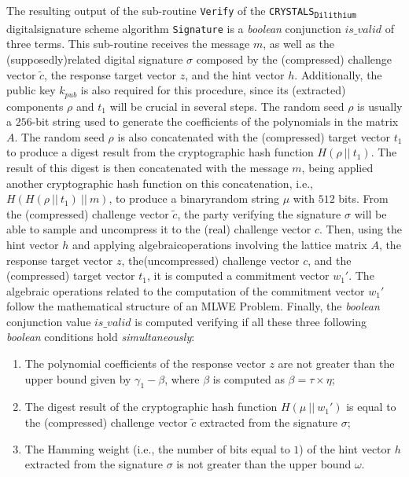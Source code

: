 \documentclass[runningheads]{llncs}
\numberwithin{equation}{section}
\begin{document}
    \noindent The resulting output of the sub-routine \texttt{Verify} of the \texorpdfstring{\texttt{CRYSTALS}\textsubscript{\texttt{Dilithium}}}\/ digital\break signature scheme algorithm \texttt{Signature} is a \textit{boolean} conjunction $is\_valid$ of three terms. This sub-routine receives the message $m$, as well as the (supposedly)\break related digital signature $\sigma$ composed by the (compressed) challenge vector $\tilde{c}$, the response target vector $z$, and the hint vector $h$. Additionally, the public key ${k}_{pub}$ is also required for this procedure, since its (extracted) components $\rho$ and ${t}_{1}$ will be crucial in several steps. The random seed $\rho$ is usually a $256$-bit string used to generate the coefficients of the polynomials in the matrix $A$. The random seed $\rho$ is also concatenated with the (compressed) target vector ${t}_{1}$ to produce a digest result from the cryptographic hash function $H(\rho\ ||\ {t}_{1})$. The result of this digest is then concatenated with the message $m$, being applied another cryptographic hash function on this concatenation, i.e., $H\left(H( \rho\ ||\ {t}_{1} )\ ||\ m \right)$, to produce a binary\break random string $\mu$ with $512$ bits. From the (compressed) challenge vector $\tilde{c}$, the party verifying the signature $\sigma$ will be able to sample and uncompress it to the (real) challenge vector $c$. Then, using the hint vector $h$ and applying algebraic\break operations involving the lattice matrix $A$, the response target vector $z$, the\break (uncompressed) challenge vector $c$, and the (compressed) target vector ${t}_{1}$, it is computed a commitment vector ${w}_{1}'$. The algebraic operations related to the computation of the commitment vector ${w}_{1}'$ follow the mathematical structure of an MLWE Problem. Finally, the \textit{boolean} conjunction value $is\_valid$ is computed verifying if all these three following \textit{boolean} conditions hold \textit{simultaneously}:
    \begin{enumerate}
        \item The polynomial coefficients of the response vector $z$ are not greater than the upper bound given by ${\gamma}_{1} - \beta$, where $\beta$ is computed as $\beta = \tau \times \eta$;
        \item The digest result of the cryptographic hash function $H(\mu\ ||\ {w}_{1}')$ is equal to the (compressed) challenge vector $\tilde{c}$ extracted from the signature $\sigma$;
        \item The Hamming weight (i.e., the number of bits equal to $1$) of the hint vector $h$ extracted from the signature $\sigma$ is not greater than the upper bound $\omega$.
    \end{enumerate}
\end{document}
